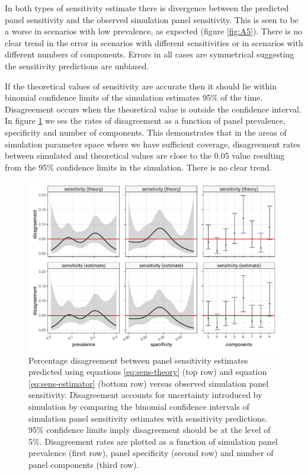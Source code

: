 \documentclass[a4paper, 12pt, twoside]{article}
\begin{document}
In both types of sensitivity estimate there is divergence between the predicted panel sensitivity and the observed simulation panel sensitivity. This is seen to be a worse in scenarios with low prevalence, as expected (figure \ref{fig:A5}). There is no clear trend in the error in scenarios with different sensitivities or in scenarios with different numbers of components. Errors in all cases are symmetrical suggesting the sensitivity predictions are unbiased.

If the theoretical values of sensitivity are accurate then it should lie within binomial confidence limits of the simulation estimates 95\% of the time. Disagreement occurs when the theoretical value is outside the confidence interval. In figure \ref{fig:A6} we ses the rates of disagreement as a function of panel prevalence, specificity and number of components. This demonstrates that in the areas of simulation parameter space where we have sufficient coverage, disagreement rates between simulated and theoretical values are close to the 0.05 value resulting from the 95\% confidence limits in the simulation. There is no clear trend.

\begin{figure}[h!]
\centering
  \includegraphics{fig/calibration-prediction-v-simulation.png}
  \caption{Percentage disagreement between panel sensitivity estimates predicted using equations \eqref{eq:sens-theory} (top row) and equation \eqref{eq:sens-estimator} (bottom row) versus observed simulation panel sensitivity. Disagreement accounts for uncertainty introduced by simulation by comparing the binomial confidence intervals of simulation panel sensitivity estimates with sensitivity predictions. 95\% confidence limits imply disagreement should be at the level of 5\%. Disagreement rates are plotted as a function of simulation panel prevalence (first row), panel specificity (second row) and number of panel components (third row).}
\label{fig:A6}
\end{figure}
\end{document}
